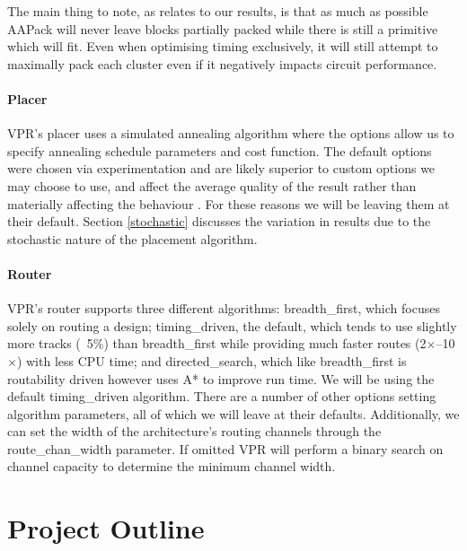 \documentclass[12pt,final,oneside,a4paper]{dwThesis} %
\begin{document}
   The main thing to
   note, as relates to our results, is that as much as possible AAPack will
   never leave blocks partially packed while there is still a primitive
   which will fit. Even when optimising timing exclusively, it will still
   attempt to maximally pack each cluster even if it negatively impacts circuit performance.

   \subsubsection{Placer} \gls{VPR}'s placer uses a simulated annealing
   algorithm where the options allow us to specify annealing schedule
   parameters and cost function. The default options were chosen via
   experimentation and are likely superior to custom options we may choose to
   use, and affect the average quality of the result rather than materially
   affecting the behaviour \cite{VPRManual, VPRBook}. For these reasons we will
   be leaving them at their default. Section \ref{stochastic} discusses the
   variation in results due to the stochastic nature of the placement
   algorithm.
   \subsubsection{Router} \gls{VPR}'s router supports three
   different algorithms: breadth\_first, which
   focuses solely on routing a design; timing\_driven, the default, which tends
   to use slightly more tracks (~5\%) than breadth\_first while providing much
   faster routes (2$\times$--10$\times$) with less CPU time; and
   directed\_search, which like breadth\_first is routability driven however
   uses A* to improve run time. We will be using the default timing\_driven
   algorithm. There are a number of other options setting
   algorithm parameters, all of which we will leave at their defaults.
   Additionally, we can set the width of the architecture's routing channels through the
   route\_chan\_width parameter.
   If omitted \gls{VPR} will perform a binary search on channel capacity to
   determine the minimum channel width.


   \chapter{Project Outline}
\end{document}
